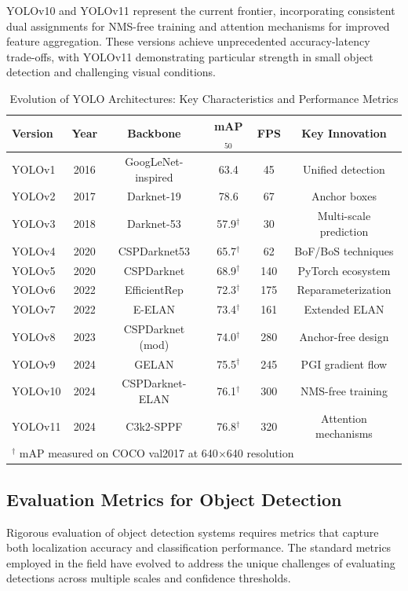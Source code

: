 YOLOv10 and YOLOv11 represent the current frontier, incorporating consistent dual assignments for NMS-free training and attention mechanisms for improved feature aggregation. These versions achieve unprecedented accuracy-latency trade-offs, with YOLOv11 demonstrating particular strength in small object detection and challenging visual conditions.

\begin{table}[htbp]
\centering
\caption{Evolution of YOLO Architectures: Key Characteristics and Performance Metrics}
\label{tab:yolo_comparison}
\begin{tabular}{lccccc}
\toprule
\textbf{Version} & \textbf{Year} & \textbf{Backbone} & \textbf{mAP$_{50}$} & \textbf{FPS} & \textbf{Key Innovation} \\
\midrule
YOLOv1 & 2016 & GoogLeNet-inspired & 63.4 & 45 & Unified detection \\
YOLOv2 & 2017 & Darknet-19 & 78.6 & 67 & Anchor boxes \\
YOLOv3 & 2018 & Darknet-53 & 57.9$^\dagger$ & 30 & Multi-scale prediction \\
YOLOv4 & 2020 & CSPDarknet53 & 65.7$^\dagger$ & 62 & BoF/BoS techniques \\
YOLOv5 & 2020 & CSPDarknet & 68.9$^\dagger$ & 140 & PyTorch ecosystem \\
YOLOv6 & 2022 & EfficientRep & 72.3$^\dagger$ & 175 & Reparameterization \\
YOLOv7 & 2022 & E-ELAN & 73.4$^\dagger$ & 161 & Extended ELAN \\
YOLOv8 & 2023 & CSPDarknet (mod) & 74.0$^\dagger$ & 280 & Anchor-free design \\
YOLOv9 & 2024 & GELAN & 75.5$^\dagger$ & 245 & PGI gradient flow \\
YOLOv10 & 2024 & CSPDarknet-ELAN & 76.1$^\dagger$ & 300 & NMS-free training \\
YOLOv11 & 2024 & C3k2-SPPF & 76.8$^\dagger$ & 320 & Attention mechanisms \\
\bottomrule
\multicolumn{6}{l}{\footnotesize $^\dagger$ mAP measured on COCO val2017 at 640$\times$640 resolution}
\end{tabular}
\end{table}

\subsection{Evaluation Metrics for Object Detection}
\label{subsec:eval_metrics}

Rigorous evaluation of object detection systems requires metrics that capture both localization accuracy and classification performance. The standard metrics employed in the field have evolved to address the unique challenges of evaluating detections across multiple scales and confidence thresholds.

